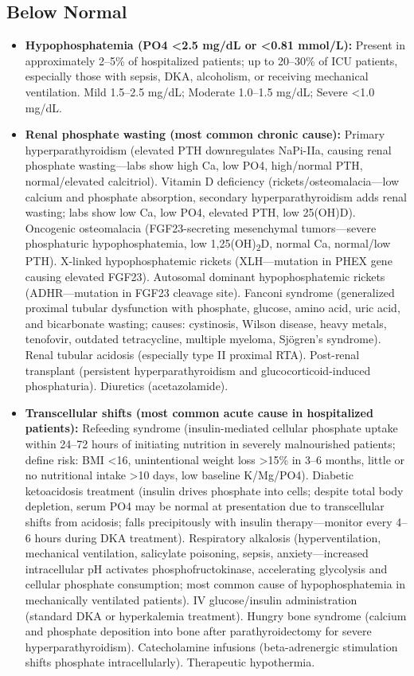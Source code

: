 \subsection*{Below Normal}
\begin{itemize}
  \item \textbf{Hypophosphatemia (PO4 <2.5 mg/dL or <0.81 mmol/L):} Present in approximately 2--5\% of hospitalized patients; up to 20--30\% of ICU patients, especially those with sepsis, DKA, alcoholism, or receiving mechanical ventilation. Mild 1.5--2.5 mg/dL; Moderate 1.0--1.5 mg/dL; Severe <1.0 mg/dL.
  \item \textbf{Renal phosphate wasting (most common chronic cause):} Primary hyperparathyroidism (elevated PTH downregulates NaPi-IIa, causing renal phosphate wasting---labs show high Ca, low PO4, high/normal PTH, normal/elevated calcitriol). Vitamin D deficiency (rickets/osteomalacia---low calcium and phosphate absorption, secondary hyperparathyroidism adds renal wasting; labs show low Ca, low PO4, elevated PTH, low 25(OH)D). Oncogenic osteomalacia (FGF23-secreting mesenchymal tumors---severe phosphaturic hypophosphatemia, low 1,25(OH)\textsubscript{2}D, normal Ca, normal/low PTH). X-linked hypophosphatemic rickets (XLH---mutation in PHEX gene causing elevated FGF23). Autosomal dominant hypophosphatemic rickets (ADHR---mutation in FGF23 cleavage site). Fanconi syndrome (generalized proximal tubular dysfunction with phosphate, glucose, amino acid, uric acid, and bicarbonate wasting; causes: cystinosis, Wilson disease, heavy metals, tenofovir, outdated tetracycline, multiple myeloma, Sj\"{o}gren's syndrome). Renal tubular acidosis (especially type II proximal RTA). Post-renal transplant (persistent hyperparathyroidism and glucocorticoid-induced phosphaturia). Diuretics (acetazolamide).
  \item \textbf{Transcellular shifts (most common acute cause in hospitalized patients):} Refeeding syndrome (insulin-mediated cellular phosphate uptake within 24--72 hours of initiating nutrition in severely malnourished patients; define risk: BMI <16, unintentional weight loss >15\% in 3--6 months, little or no nutritional intake >10 days, low baseline K/Mg/PO4). Diabetic ketoacidosis treatment (insulin drives phosphate into cells; despite total body depletion, serum PO4 may be normal at presentation due to transcellular shifts from acidosis; falls precipitously with insulin therapy---monitor every 4--6 hours during DKA treatment). Respiratory alkalosis (hyperventilation, mechanical ventilation, salicylate poisoning, sepsis, anxiety---increased intracellular pH activates phosphofructokinase, accelerating glycolysis and cellular phosphate consumption; most common cause of hypophosphatemia in mechanically ventilated patients). IV glucose/insulin administration (standard DKA or hyperkalemia treatment). Hungry bone syndrome (calcium and phosphate deposition into bone after parathyroidectomy for severe hyperparathyroidism). Catecholamine infusions (beta-adrenergic stimulation shifts phosphate intracellularly). Therapeutic hypothermia.

\end{itemize}
